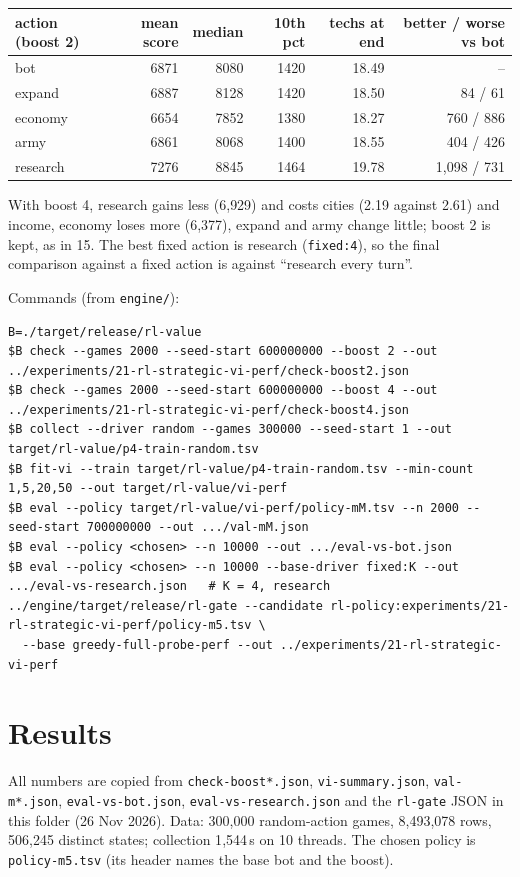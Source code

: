 \documentclass{../polyexp}
\begin{document}
\begin{center}\small
\begin{tabular}{lrrrrr}
\toprule
action (boost 2) & mean score & median & 10th pct & techs at end & better / worse vs bot \\
\midrule
bot      & 6871 & 8080 & 1420 & 18.49 & -- \\
expand   & 6887 & 8128 & 1420 & 18.50 & 84 / 61 \\
economy  & 6654 & 7852 & 1380 & 18.27 & 760 / 886 \\
army     & 6861 & 8068 & 1400 & 18.55 & 404 / 426 \\
research & 7276 & 8845 & 1464 & 19.78 & 1{,}098 / 731 \\
\bottomrule
\end{tabular}
\end{center}
With boost 4, research gains less (6{,}929) and costs cities (2.19 against 2.61) and income, economy loses more
(6{,}377), expand and army change little; boost 2 is kept, as in 15. The best fixed action is research
(\texttt{fixed:4}), so the final comparison against a fixed action is against ``research every turn''.

Commands (from \texttt{engine/}):
\begin{verbatim}
B=./target/release/rl-value
$B check --games 2000 --seed-start 600000000 --boost 2 --out ../experiments/21-rl-strategic-vi-perf/check-boost2.json
$B check --games 2000 --seed-start 600000000 --boost 4 --out ../experiments/21-rl-strategic-vi-perf/check-boost4.json
$B collect --driver random --games 300000 --seed-start 1 --out target/rl-value/p4-train-random.tsv
$B fit-vi --train target/rl-value/p4-train-random.tsv --min-count 1,5,20,50 --out target/rl-value/vi-perf
$B eval --policy target/rl-value/vi-perf/policy-mM.tsv --n 2000 --seed-start 700000000 --out .../val-mM.json
$B eval --policy <chosen> --n 10000 --out .../eval-vs-bot.json
$B eval --policy <chosen> --n 10000 --base-driver fixed:K --out .../eval-vs-research.json   # K = 4, research
../engine/target/release/rl-gate --candidate rl-policy:experiments/21-rl-strategic-vi-perf/policy-m5.tsv \
  --base greedy-full-probe-perf --out ../experiments/21-rl-strategic-vi-perf
\end{verbatim}

\section{Results}
\ExpResults

All numbers are copied from \texttt{check-boost*.json}, \texttt{vi-summary.json}, \texttt{val-m*.json},
\texttt{eval-vs-bot.json}, \texttt{eval-vs-research.json} and the \texttt{rl-gate} JSON in this folder (26 Nov
2026). Data: 300{,}000 random-action games, 8{,}493{,}078 rows, 506{,}245 distinct states; collection 1{,}544\,s on 10
threads. The chosen policy is \texttt{policy-m5.tsv} (its header names the base bot and the boost).
\end{document}
